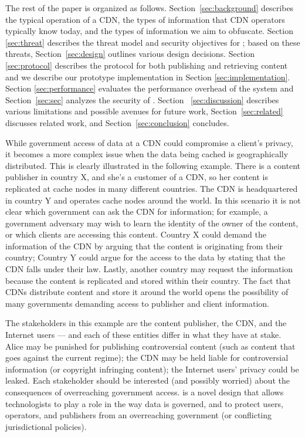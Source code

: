 The rest of the paper is organized as follows. Section~\ref{sec:background} describes
the typical operation of a CDN, the types of information that CDN operators
typically know today, and the types of information we aim to obfuscate.  Section~
\ref{sec:threat} describes the threat model and security objectives for \system{}; based
on these threats, Section~\ref{sec:design} outlines various design decisions. Section~
\ref{sec:protocol} describes the protocol for both publishing and retrieving content and we describe 
our prototype implementation in Section \ref{sec:implementation}.
Section \ref{sec:performance} evaluates the performance overhead of the system and Section~\ref{sec:sec} 
analyzes the security of \system{}. Section~
\ref{sec:discussion} describes various limitations and possible avenues for future
work, Section~\ref{sec:related} discusses related work, and Section~\ref{sec:conclusion}
concludes.


While government access of data at a CDN could compromise a client's privacy,
it becomes a more complex issue when the data being cached is geographically
distributed. This is clearly illustrated in the following example.  There is a
content publisher in  country X, and she's a customer of a CDN, so her content
is replicated at cache nodes in many  different countries.  The CDN is
headquartered  in country Y and operates cache nodes around the world.  In
this scenario it is not clear which government can ask the CDN for
information; for  example, a government adversary may wish to learn the
identity of the owner of the content, or which clients are accessing  this
content.  Country X could demand the information of the CDN by arguing that
the content is originating  from their country; Country Y could argue for the
access to the data by stating that the CDN falls under their  law.  Lastly,
another country may request the information because the content is replicated
and stored within  their country.  The fact that CDNs distribute content and
store it around the world opens the possibility of  many governments demanding
access to publisher and client information.

The stakeholders in this example are the content publisher, the CDN, and the
Internet users --- and each of these entities differ in what  they have at
stake.  Alice may be punished for publishing controversial content (such as
content that  goes against the current regime); the CDN  may be held liable
for controversial information (or copyright infringing content); the Internet
users'  privacy could be leaked.  Each stakeholder should be interested (and
possibly worried) about the  consequences of overreaching government access.
\system{} is a novel design that allows technologists to play  a role in the
way data is governed, and to protect users, operators, and publishers from an
overreaching government (or  conflicting jurisdictional policies).
\fi 
